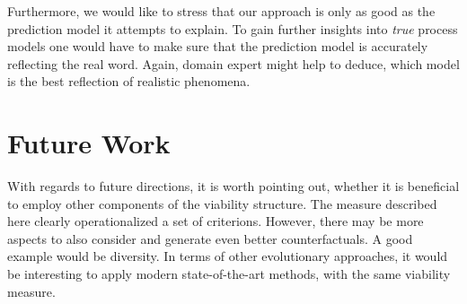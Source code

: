 \documentclass[12pt,a4paper]{report}
\begin{document}
Furthermore, we would like to stress that our approach is only as good as the prediction model it attempts to explain. To gain further insights into \emph{true} process models one would have to make sure that the prediction model is accurately reflecting the real word. Again, domain expert might help to deduce, which model is the best reflection of realistic phenomena.


\section{Future Work}
With regards to future directions, it is worth pointing out, whether it is beneficial to employ other components of the viability structure. The measure described here clearly operationalized a set of criterions. However, there may be more aspects to also consider and generate even better counterfactuals. A good example would be diversity. In terms of other evolutionary approaches, it would be interesting to apply modern state-of-the-art methods, with the same viability measure.


\end{document}
